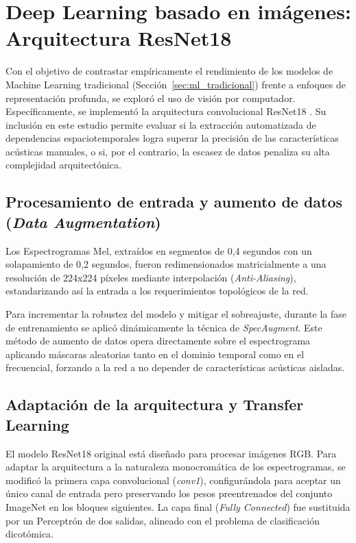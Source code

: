 \section{Deep Learning basado en imágenes: Arquitectura ResNet18}\label{sec:resnet}

Con el objetivo de contrastar empíricamente el rendimiento de los modelos de Machine Learning tradicional (Sección~\ref{sec:ml_tradicional}) frente a enfoques de representación profunda, se exploró el uso de visión por computador. Específicamente, se implementó la arquitectura convolucional ResNet18 \cite{he2016}. Su inclusión en este estudio permite evaluar si la extracción automatizada de dependencias espaciotemporales logra superar la precisión de las características acústicas manuales, o si, por el contrario, la escasez de datos penaliza su alta complejidad arquitectónica.

\subsection{Procesamiento de entrada y aumento de datos (\textit{Data Augmentation})}
Los Espectrogramas Mel, extraídos en segmentos de 0,4 segundos con un solapamiento de 0,2 segundos, fueron redimensionados matricialmente a una resolución de 224x224 píxeles mediante interpolación (\textit{Anti-Aliasing}), estandarizando así la entrada a los requerimientos topológicos de la red. 

Para incrementar la robustez del modelo y mitigar el sobreajuste, durante la fase de entrenamiento se aplicó dinámicamente la técnica de \textit{SpecAugment}. Este método de aumento de datos opera directamente sobre el espectrograma aplicando máscaras aleatorias tanto en el dominio temporal como en el frecuencial, forzando a la red a no depender de características acústicas aisladas.

\subsection{Adaptación de la arquitectura y Transfer Learning}
El modelo ResNet18 original está diseñado para procesar imágenes RGB. Para adaptar la arquitectura a la naturaleza monocromática de los espectrogramas, se modificó la primera capa convolucional (\textit{conv1}), configurándola para aceptar un único canal de entrada pero preservando los pesos preentrenados del conjunto ImageNet en los bloques siguientes. La capa final (\textit{Fully Connected}) fue sustituida por un Perceptrón de dos salidas, alineado con el problema de clasificación dicotómica.

